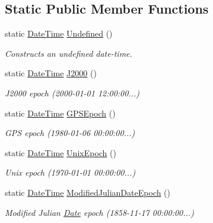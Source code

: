 \subsection*{Static Public Member Functions}
\begin{DoxyCompactItemize}
\item 
static \hyperlink{classostk_1_1physics_1_1time_1_1_date_time}{Date\+Time} \hyperlink{classostk_1_1physics_1_1time_1_1_date_time_a9ca19b137678a1c4a97df8c96a1f3f80}{Undefined} ()
\begin{DoxyCompactList}\small\item\em Constructs an undefined date-\/time. \end{DoxyCompactList}\item 
static \hyperlink{classostk_1_1physics_1_1time_1_1_date_time}{Date\+Time} \hyperlink{classostk_1_1physics_1_1time_1_1_date_time_a819a122626c39c4cc99429f5ae9fa749}{J2000} ()
\begin{DoxyCompactList}\small\item\em J2000 epoch (2000-\/01-\/01 12\+:00\+:00...) \end{DoxyCompactList}\item 
static \hyperlink{classostk_1_1physics_1_1time_1_1_date_time}{Date\+Time} \hyperlink{classostk_1_1physics_1_1time_1_1_date_time_a034452967c2b5a89368d33a61dec2606}{G\+P\+S\+Epoch} ()
\begin{DoxyCompactList}\small\item\em G\+PS epoch (1980-\/01-\/06 00\+:00\+:00...) \end{DoxyCompactList}\item 
static \hyperlink{classostk_1_1physics_1_1time_1_1_date_time}{Date\+Time} \hyperlink{classostk_1_1physics_1_1time_1_1_date_time_a3f3b2cb5f50eb5fe0df9840c2563f8f7}{Unix\+Epoch} ()
\begin{DoxyCompactList}\small\item\em Unix epoch (1970-\/01-\/01 00\+:00\+:00...) \end{DoxyCompactList}\item 
static \hyperlink{classostk_1_1physics_1_1time_1_1_date_time}{Date\+Time} \hyperlink{classostk_1_1physics_1_1time_1_1_date_time_a21b33a253f185060eb898f6d7d760706}{Modified\+Julian\+Date\+Epoch} ()
\begin{DoxyCompactList}\small\item\em Modified Julian \hyperlink{classostk_1_1physics_1_1time_1_1_date}{Date} epoch (1858-\/11-\/17 00\+:00\+:00...) \end{DoxyCompactList}\item 

\end{DoxyCompactItemize}
